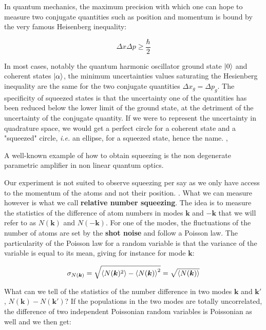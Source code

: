 In quantum mechanics, the maximum precision with which one can hope to measure two conjugate quantities such as position and momentum is bound by the very famous Heisenberg inequality:

\begin{equation}
    \Delta x \Delta p \geq \frac{\hbar}{2}
\end{equation}

In most cases, notably the quantum harmonic oscillator ground state $\ket{0}$ and coherent states $\ket{\alpha}$, the minimum uncertainties values saturating the Hesienberg inequality are the same for the two conjugate quantities $\Delta x_{g} = \Delta p_g$. The specificity of squeezed states is that the uncertainty one of the quantities has been reduced below the lower limit of the ground state, at the detriment of the uncertainty of the conjugate quantity. If we were to represent the uncertainty in quadrature space, we would get a perfect circle for a coherent state and a "squeezed" circle, {\it i.e.} an ellipse, for a squeezed state, hence the name. , 

A well-known example of how to obtain squeezing is the non degenerate parametric amplifier in non linear quantum optics. 

Our experiment is not suited to observe squeezing per say as we only have access to the momentum of the atoms and not their position. . What we can measure however is what we call \textbf{relative number squeezing}. The idea is to measure the statistics of the difference of atom numbers in modes $\bm{k}$ and $-\bm{k}$ that we will refer to as $N(\bm{k})$ and $N(-\bm{k})$. For one of the modes, the fluctuations of the number of atoms are set by the \textbf{shot noise} and follow a Poisson law. The particularity of the Poisson law for a random variable is that the variance of the variable is equal to its mean, giving for instance for mode $\bm{k}$:

\begin{equation}
    \sigma_{N(\bm{k})} =\sqrt{\left\langle N(\bm{k})^2\right\rangle-\left\langle N(\bm{k})\right\rangle^2} = \sqrt{\left\langle N(\bm{k})\right\rangle}
\end{equation}

What can we tell of the statistics of the number difference in two modes $\bm{k}$ and $\bm{k}'$, $N(\bm{k}) - N(\bm{k}')$? If the populations in the two modes are totally uncorrelated, the difference of two independent Poissonian random variables is Poissonian as well and we then get:

